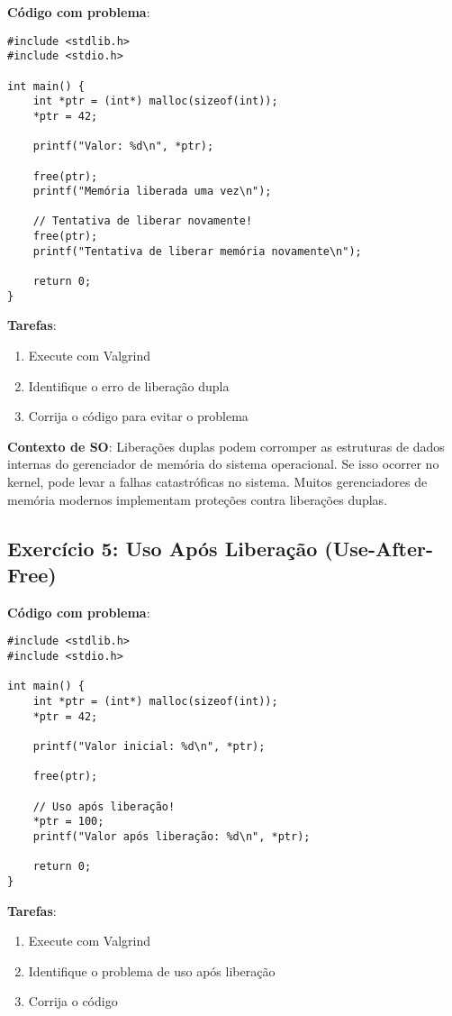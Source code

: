 \documentclass[11pt,a4paper]{article}
\begin{document}
\textbf{Código com problema}:

\begin{lstlisting}
#include <stdlib.h>
#include <stdio.h>

int main() {
    int *ptr = (int*) malloc(sizeof(int));
    *ptr = 42;
    
    printf("Valor: %d\n", *ptr);
    
    free(ptr);
    printf("Memória liberada uma vez\n");
    
    // Tentativa de liberar novamente!
    free(ptr);
    printf("Tentativa de liberar memória novamente\n");
    
    return 0;
}
\end{lstlisting}

\textbf{Tarefas}:
\begin{enumerate}
    \item Execute com Valgrind
    \item Identifique o erro de liberação dupla
    \item Corrija o código para evitar o problema
\end{enumerate}

\textbf{Contexto de SO}: Liberações duplas podem corromper as estruturas de dados internas do gerenciador de memória do sistema operacional. Se isso ocorrer no kernel, pode levar a falhas catastróficas no sistema. Muitos gerenciadores de memória modernos implementam proteções contra liberações duplas.

\subsection{Exercício 5: Uso Após Liberação (Use-After-Free)}

\textbf{Código com problema}:

\begin{lstlisting}
#include <stdlib.h>
#include <stdio.h>

int main() {
    int *ptr = (int*) malloc(sizeof(int));
    *ptr = 42;
    
    printf("Valor inicial: %d\n", *ptr);
    
    free(ptr);
    
    // Uso após liberação!
    *ptr = 100;
    printf("Valor após liberação: %d\n", *ptr);
    
    return 0;
}
\end{lstlisting}

\textbf{Tarefas}:
\begin{enumerate}
    \item Execute com Valgrind
    \item Identifique o problema de uso após liberação
    \item Corrija o código
\end{enumerate}
\end{document}
